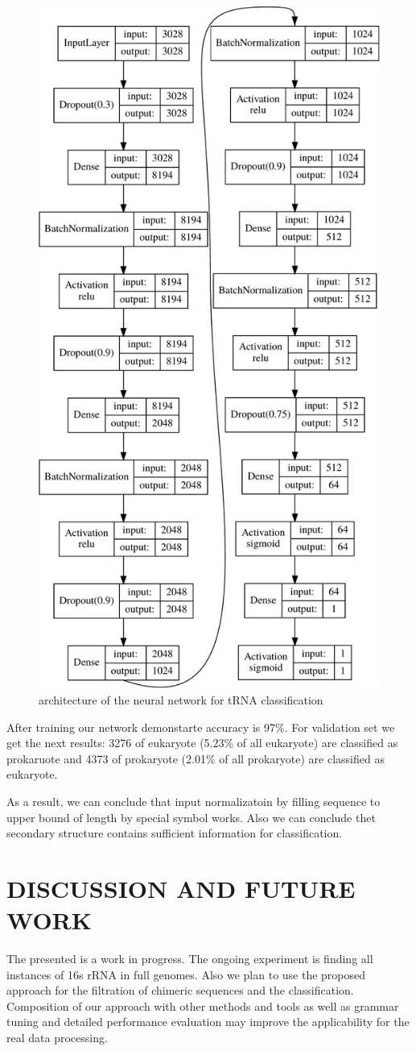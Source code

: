 \documentclass[a4paper,twoside]{article}
\begin{document}
\begin{figure}
\centering
\includegraphics[width=.4\textwidth]{figures/model-crop.pdf}
\caption{architecture of the neural network for tRNA classification}
\label{fig:nn}
\end{figure}

After training our network demonstarte accuracy is 97\%. 
For validation set we get the next results: 3276 of eukaryote (5.23\% of all eukaryote) are classified as prokaruote and 4373 of prokaryote (2.01\% of all prokaryote) are classified as eukaryote. 

As a result, we can conclude that input normalizatoin by filling sequence to upper bound of length by special symbol works.
Also we can conclude thet secondary structure contains sufficient information for classification.


\section{\uppercase{Discussion and Future Work}}
\label{sec:Discussion}

\noindent The presented is a work in progress. 
The ongoing experiment is finding all instances of 16s rRNA in full genomes.
Also we plan to use the proposed approach for the filtration of chimeric sequences and the classification.
Composition of our approach with other methods and tools as well as grammar tuning and detailed performance evaluation may improve the applicability for the real data processing.
\end{document}
